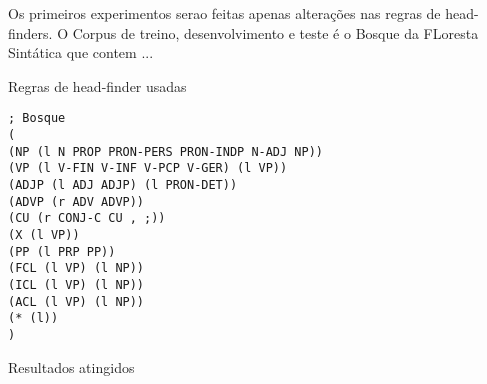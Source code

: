 Os primeiros experimentos serao feitas apenas alterações nas regras de head-finders. O Corpus de treino, desenvolvimento e teste é o Bosque da FLoresta Sintática que contem ... 

Regras de head-finder usadas

\scriptsize

\begin{verbatim}
; Bosque
(
(NP (l N PROP PRON-PERS PRON-INDP N-ADJ NP))
(VP (l V-FIN V-INF V-PCP V-GER) (l VP))
(ADJP (l ADJ ADJP) (l PRON-DET))
(ADVP (r ADV ADVP))
(CU (r CONJ-C CU , ;))
(X (l VP))
(PP (l PRP PP))
(FCL (l VP) (l NP))
(ICL (l VP) (l NP))
(ACL (l VP) (l NP))
(* (l))
)

\end{verbatim}

Resultados atingidos

